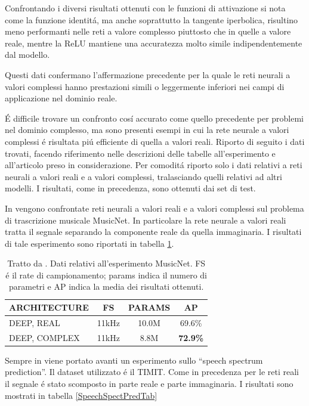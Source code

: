 \documentclass[a4paper,12pt]{report}
\begin{document}
 Confrontando i diversi risultati ottenuti con le funzioni di attivazione si nota come la funzione identit\'a, ma anche soprattutto la tangente iperbolica, risultino meno performanti nelle reti a valore complesso piuttosto che in quelle a valore reale, mentre la ReLU mantiene una accuratezza molto simile indipendentemente dal modello. 
 
 Questi dati confermano l'affermazione precedente per la quale le reti neurali a valori complessi hanno prestazioni simili o leggermente inferiori nei campi di applicazione nel dominio reale. 
 
 \'E difficile trovare un confronto cos\'i accurato come quello precedente per problemi nel dominio complesso, ma sono presenti esempi in cui la rete neurale a valori complessi \'e risultata pi\'u efficiente di quella a valori reali. 
 Riporto di seguito i dati trovati, facendo riferimento nelle descrizioni delle tabelle all'esperimento e all'articolo preso in considerazione. 
 Per comodit\'a riporto solo i dati relativi a reti neurali a valori reali e a valori complessi, tralasciando quelli relativi ad altri modelli.
 I risultati, come in precedenza, sono ottenuti dai set di test.
 
 In \cite{trabelsi2017deep} vengono confrontate reti neurali a valori reali e a valori complessi sul problema di trascrizione musicale MusicNet. 
 In particolare la rete neurale a valori reali tratta il segnale separando la componente reale da quella immaginaria. I risultati di tale esperimento sono riportati in tabella \ref{MusicNetTab}.
 
 \begin{table}[h]
  \centering
  \begin{tabular}{l c c|c}
   \hline
   \textbf{ARCHITECTURE} & \textbf{FS} & \textbf{PARAMS} & \textbf{AP} \\
   \hline
   DEEP, REAL & 11kHz & 10.0M & 69.6\% \\
   DEEP, COMPLEX & 11kHz & 8.8M & \textbf{72.9\%} \\
   \hline
  \end{tabular}
  \caption{Tratto da \cite{trabelsi2017deep}. Dati relativi all'esperimento MusicNet. FS \'e il rate di campionamento; params indica il numero di parametri e AP indica la media dei risultati ottenuti.}
  \label{MusicNetTab}
 \end{table}
 
 Sempre in \cite{trabelsi2017deep} viene portato avanti un esperimento sullo ``speech spectrum prediction''. Il dataset utilizzato \'e il TIMIT. Come in precedenza per le reti reali il segnale \'e stato scomposto in parte reale e parte immaginaria. I risultati sono mostrati in tabella \ref{SpeechSpectPredTab}
 
\end{document}
